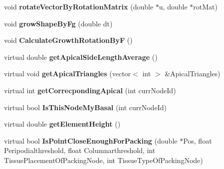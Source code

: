 \begin{DoxyCompactItemize}
\item 
\hypertarget{classShapeBase_ad803a237b7e7c06d419a308625a599e0}{}void {\bfseries rotate\+Vector\+By\+Rotation\+Matrix} (double $\ast$u, double $\ast$rot\+Mat)\label{classShapeBase_ad803a237b7e7c06d419a308625a599e0}

\item 
\hypertarget{classShapeBase_aa83e1b27ea3a67b958afd06f9095e0de}{}void {\bfseries grow\+Shape\+By\+Fg} (double dt)\label{classShapeBase_aa83e1b27ea3a67b958afd06f9095e0de}

\item 
\hypertarget{classShapeBase_a9ae4c5fc8817528493502e3f75c9a984}{}void {\bfseries Calculate\+Growth\+Rotation\+By\+F} ()\label{classShapeBase_a9ae4c5fc8817528493502e3f75c9a984}

\item 
\hypertarget{classShapeBase_a6d8088a8bb897d79a796a253c06d954f}{}virtual double {\bfseries get\+Apical\+Side\+Length\+Average} ()\label{classShapeBase_a6d8088a8bb897d79a796a253c06d954f}

\item 
\hypertarget{classShapeBase_a440ec12735963373a1e90922c0b57bac}{}virtual void {\bfseries get\+Apical\+Triangles} (vector$<$ int $>$ \&Apical\+Triangles)\label{classShapeBase_a440ec12735963373a1e90922c0b57bac}

\item 
\hypertarget{classShapeBase_ac210b3828c14aa394e6e2222617ddcfa}{}virtual int {\bfseries get\+Correcponding\+Apical} (int curr\+Node\+Id)\label{classShapeBase_ac210b3828c14aa394e6e2222617ddcfa}

\item 
\hypertarget{classShapeBase_abc13c22e407ba29384b0995a55f32463}{}virtual bool {\bfseries Is\+This\+Node\+My\+Basal} (int curr\+Node\+Id)\label{classShapeBase_abc13c22e407ba29384b0995a55f32463}

\item 
\hypertarget{classShapeBase_a995a5e6a553ed0cdaadf74dab4f88822}{}virtual double {\bfseries get\+Element\+Height} ()\label{classShapeBase_a995a5e6a553ed0cdaadf74dab4f88822}

\item 
\hypertarget{classShapeBase_a1c09acb3989e4d461c2ce74715214954}{}virtual bool {\bfseries Is\+Point\+Close\+Enough\+For\+Packing} (double $\ast$Pos, float Peripodialthreshold, float Columnarthreshold, int Tissue\+Placement\+Of\+Packing\+Node, int Tissue\+Type\+Of\+Packing\+Node)\label{classShapeBase_a1c09acb3989e4d461c2ce74715214954}


\end{DoxyCompactItemize}
